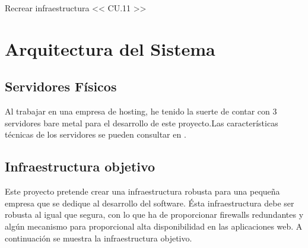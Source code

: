 \begin{usecase}{Recrear infraestructura << CU.11 >>}
	
	
	
	
\hline
\end{usecase}


\section{Arquitectura del Sistema}
	\subsection{Servidores Físicos}
		\begin{text}
			Al trabajar en una empresa de hosting, he tenido la suerte de contar con 3 servidores bare metal para el desarrollo de este proyecto.Las características técnicas de los servidores se pueden consultar en .
		\end{text}
	\subsection{Infraestructura objetivo}
		\label{InfraestructuraObjetivo}
		\begin{text}
			Este proyecto pretende crear una infraestructura robusta para una pequeña empresa que se dedique al desarrollo del software. Ésta infraestructura debe ser robusta al igual que segura, con lo que ha de proporcionar firewalls redundantes y algún mecanismo para proporcional alta disponibilidad en las aplicaciones web.  A continuación se muestra la infraestructura objetivo.
		\end{text}
	
